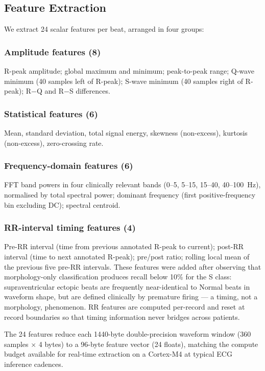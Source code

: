 \documentclass[journal,twoside]{IEEEtran}
\begin{document}
\subsection{Feature Extraction}
We extract 24 scalar features per beat, arranged in four groups:

\subsubsection{Amplitude features (8)}
R-peak amplitude; global maximum and minimum; peak-to-peak range;
Q-wave minimum (40 samples left of R-peak); S-wave minimum (40 samples
right of R-peak); R$-$Q and R$-$S differences.

\subsubsection{Statistical features (6)}
Mean, standard deviation, total signal energy, skewness (non-excess),
kurtosis (non-excess), zero-crossing rate.

\subsubsection{Frequency-domain features (6)}
FFT band powers in four clinically relevant bands (0--5, 5--15, 15--40,
40--100~Hz), normalised by total spectral power; dominant frequency
(first positive-frequency bin excluding DC); spectral centroid.

\subsubsection{RR-interval timing features (4)}
Pre-RR interval (time from previous annotated R-peak to current);
post-RR interval (time to next annotated R-peak); pre/post ratio;
rolling local mean of the previous five pre-RR intervals.
These features were added after observing that morphology-only
classification produces recall below 10\% for the S class:
supraventricular ectopic beats are frequently near-identical to Normal
beats in waveform shape, but are defined clinically by premature
firing — a timing, not a morphology, phenomenon. RR features are computed
per-record and reset at record boundaries so that timing information never
bridges across patients.

The 24 features reduce each 1440-byte double-precision waveform window
(360 samples $\times$ 4 bytes) to a 96-byte feature vector (24 floats),
matching the compute budget available for real-time extraction on
a Cortex-M4 at typical ECG inference cadences.
\end{document}
